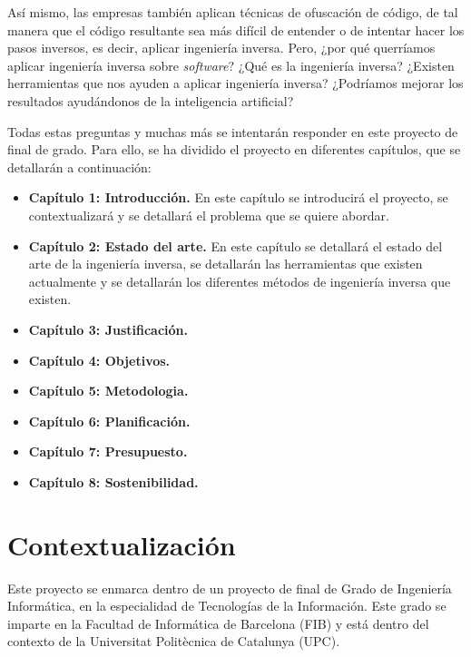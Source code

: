 Así mismo, las empresas también aplican técnicas de ofuscación de código, de tal
manera que el código resultante sea más difícil de entender o de intentar hacer los
pasos inversos, es decir, aplicar ingeniería inversa. Pero, ¿por qué querríamos
aplicar ingeniería inversa sobre \textit{software}? ¿Qué es la ingeniería inversa? ¿Existen
herramientas que nos ayuden a aplicar ingeniería inversa? ¿Podríamos mejorar los
resultados ayudándonos de la inteligencia artificial?

Todas estas preguntas y muchas más se intentarán responder en este proyecto de final
de grado. Para ello, se ha dividido el proyecto en diferentes capítulos, que se
detallarán a continuación:


\begin{itemize}
    \item \textbf{Capítulo 1: Introducción.} En este capítulo se introducirá el proyecto,
        se contextualizará y se detallará el problema que se quiere abordar.
    \item \textbf{Capítulo 2: Estado del arte.} En este capítulo se detallará el estado
        del arte de la ingeniería inversa, se detallarán las herramientas que existen
        actualmente y se detallarán los diferentes métodos de ingeniería inversa que existen.
    \item \textbf{Capítulo 3: Justificación.} 
    \item \textbf{Capítulo 4: Objetivos.} 
    \item \textbf{Capítulo 5: Metodologia.}
    \item \textbf{Capítulo 6: Planificación.} 
    \item \textbf{Capítulo 7: Presupuesto.} 
    \item \textbf{Capítulo 8: Sostenibilidad.} 
\end{itemize}

\section{Contextualización}
\label{sec:contextualizacion}


Este proyecto se enmarca dentro de un proyecto de final de Grado de Ingeniería
Informática, en la especialidad de Tecnologías de la Información. Este grado se
imparte en la Facultad de Informática de Barcelona (FIB) y está dentro del contexto
de la Universitat Politècnica de Catalunya (UPC).

